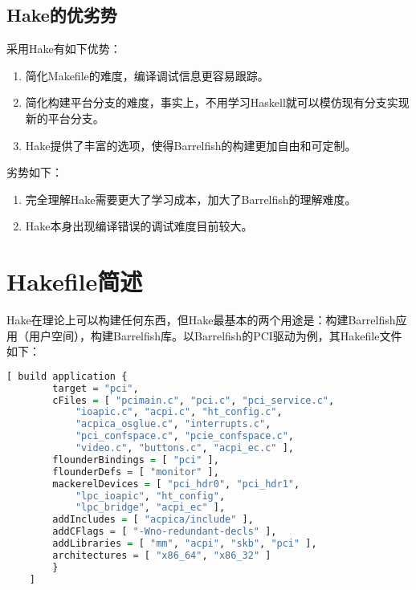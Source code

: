 \documentclass[a4paper, 12pt]{report}
\begin{document}
    \section{Hake的优劣势}
    
    采用Hake有如下优势：
    
    \begin{enumerate}
        \item 简化Makefile的难度，编译调试信息更容易跟踪。
        \item 简化构建平台分支的难度，事实上，不用学习Haskell就可以模仿现有分支实现新的平台分支。
        \item Hake提供了丰富的选项，使得Barrelfish的构建更加自由和可定制。
    \end{enumerate}
    
    劣势如下：
    
    \begin{enumerate}
        \item 完全理解Hake需要更大了学习成本，加大了Barrelfish的理解难度。
        \item Hake本身出现编译错误的调试难度目前较大。
    \end{enumerate}
    
    \chapter{Hakefile简述}
    
    Hake在理论上可以构建任何东西，但Hake最基本的两个用途是：构建Barrelfish应用（用户空间），构建Barrelfish库。以Barrelfish的PCI驱动为例，其Hakefile文件如下：
    
    \begin{lstlisting}[language = Haskell]
    [ build application {
        target = "pci",
        cFiles = [ "pcimain.c", "pci.c", "pci_service.c",
            "ioapic.c", "acpi.c", "ht_config.c",
            "acpica_osglue.c", "interrupts.c",
            "pci_confspace.c", "pcie_confspace.c",
            "video.c", "buttons.c", "acpi_ec.c" ],
        flounderBindings = [ "pci" ],
        flounderDefs = [ "monitor" ],
        mackerelDevices = [ "pci_hdr0", "pci_hdr1",
            "lpc_ioapic", "ht_config",
            "lpc_bridge", "acpi_ec" ],
        addIncludes = [ "acpica/include" ],
        addCFlags = [ "-Wno-redundant-decls" ],
        addLibraries = [ "mm", "acpi", "skb", "pci" ],
        architectures = [ "x86_64", "x86_32" ]
        }
    ]
    \end{lstlisting}
    
\end{document}
